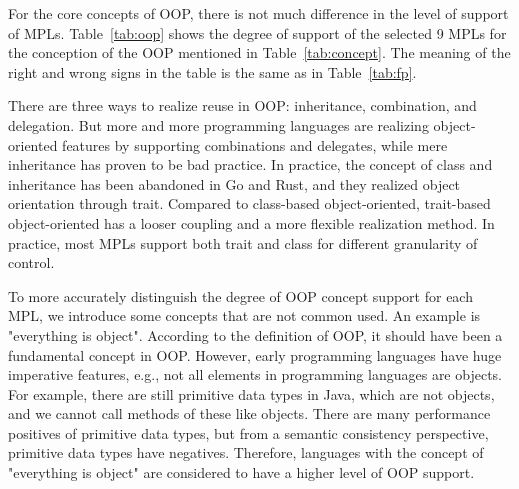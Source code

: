
For the core concepts of OOP, there is not much difference in the level of support of MPLs.
Table~\ref{tab:oop} shows the degree of support of the selected 9 MPLs for the conception of the OOP
mentioned in Table~\ref{tab:concept}.
The meaning of the right and wrong signs in the table is the same as in Table~\ref{tab:fp}.

There are three ways to realize reuse in OOP: inheritance, combination, and delegation.
But more and more programming languages are realizing object-oriented
features by supporting combinations and delegates, while mere
inheritance has proven to be bad practice\cite{gamma1995design}.
In practice, the concept of class and inheritance has been abandoned in Go and Rust,
and they realized object orientation through trait.
Compared to class-based object-oriented, trait-based object-oriented has a looser coupling
and a more flexible realization method.
In practice, most MPLs support both trait and class for different granularity of control.

To more accurately distinguish the degree of OOP concept support for each MPL,
we introduce some concepts that are not common used.
An example is "everything is object".
According to the definition of OOP, it should have been a fundamental concept in OOP\@.
However, early programming languages have huge imperative features, e.g.,
not all elements in programming languages are objects.
For example, there are still primitive data types in Java, which are not objects,
and we cannot call methods of these like objects.
There are many performance positives of primitive data types,
but from a semantic consistency perspective, primitive data types have negatives.
Therefore, languages with the concept of "everything is object" are
considered to have a higher level of OOP support.


